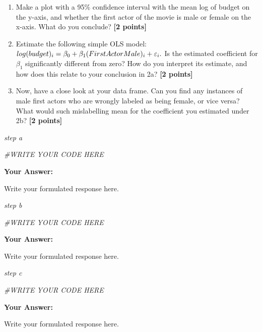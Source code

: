 \documentclass[
]{article}
\newenvironment{Shaded}{\begin{snugshade}}{\end{snugshade}}
\newcommand{\CommentTok}[1]{\textcolor[rgb]{0.56,0.35,0.01}{\textit{#1}}}
\providecommand{\tightlist}{%
  \setlength{\itemsep}{0pt}\setlength{\parskip}{0pt}}
\begin{document}
\begin{enumerate}
\def\labelenumi{\alph{enumi}.}
\tightlist
\item
  Make a plot with a 95\% confidence interval with the mean log of
  budget on the y-axis, and whether the first actor of the movie is male
  or female on the x-axis. What do you conclude? \textbf{[2 points]}
\item
  Estimate the following simple OLS model:
  \(log(budget)_i=\beta_0+\beta_1 \text(FirstActorMale)_i + \varepsilon_i.\)
  Is the estimated coefficient for \(\beta_1\) significantly different
  from zero? How do you interpret its estimate, and how does this relate
  to your conclusion in 2a? \textbf{[2 points]}
\item
  Now, have a close look at your data frame. Can you find any instances
  of male first actors who are wrongly labeled as being female, or vice
  versa? What would such mislabelling mean for the coefficient you
  estimated under 2b? \textbf{[2 points]}
\end{enumerate}

\emph{step a}

\begin{Shaded}
\begin{Highlighting}[]
\CommentTok{\#WRITE YOUR CODE HERE}
\end{Highlighting}
\end{Shaded}

\textbf{Your Answer:}

Write your formulated response here.

\emph{step b}

\begin{Shaded}
\begin{Highlighting}[]
\CommentTok{\#WRITE YOUR CODE HERE}
\end{Highlighting}
\end{Shaded}

\textbf{Your Answer:}

Write your formulated response here.

\emph{step c}

\begin{Shaded}
\begin{Highlighting}[]
\CommentTok{\#WRITE YOUR CODE HERE}
\end{Highlighting}
\end{Shaded}

\textbf{Your Answer:}

Write your formulated response here.
\end{document}
